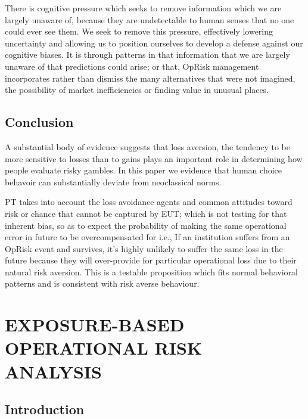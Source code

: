 \documentclass{DissertateUSU}
\begin{document}
There is cognitive pressure which seeks to remove information which we
are largely unaware of, because they are undetectable to human senses
that no one could ever see them. We seek to remove this pressure,
effectively lowering uncertainty and allowing us to position ourselves
to develop a defense against our cognitive biases. It is through
patterns in that information that we are largely unaware of that
predictions could arise; or that, OpRisk management incorporates rather
than dismiss the many alternatives that were not imagined, the
possibility of market inefficiencies or finding value in unusual places.

\section{Conclusion}
\label{sec:Conclusion}

A substantial body of evidence suggests that loss aversion, the tendency
to be more sensitive to losses than to gains plays an important role in
determining how people evaluate risky gambles. In this paper we evidence
that human choice behavoir can substantially deviate from neoclassical
norms.\medskip

PT takes into account the loss avoidance agents and common attitudes
toward risk or chance that cannot be captured by EUT; which is not
testing for that inherent bias, so as to expect the probability of
making the same operational error in future to be overcompensated for
i.e., If an institution suffers from an OpRisk event and survives, it's
highly unlikely to suffer the same loss in the future because they will
over-provide for particular operational loss due to their natural risk
aversion. This is a testable proposition which fits normal behavioral
patterns and is consistent with risk averse behaviour.

\singlespacing

\FloatBarrier
\newpage
{}
\fancyhead[R]{\thepage}
\fancyfoot[C]{}

\chapter{EXPOSURE-BASED OPERATIONAL RISK ANALYSIS}
\label{EXPOSURE-BASED OPERATIONAL RISK ANALYSIS}

\doublespacing

\section{Introduction}
\label{sec3:Introduction}
\end{document}
